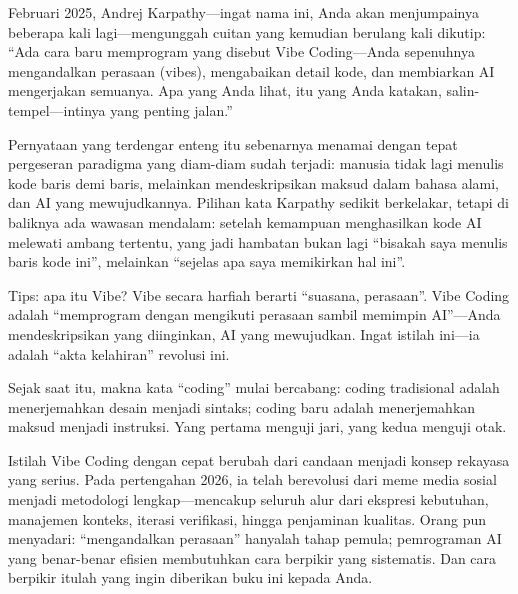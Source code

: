 


Februari 2025, Andrej Karpathy—ingat nama ini, Anda akan menjumpainya beberapa kali lagi—mengunggah cuitan yang kemudian berulang kali dikutip: “Ada cara baru memprogram yang disebut Vibe Coding—Anda sepenuhnya mengandalkan perasaan (vibes), mengabaikan detail kode, dan membiarkan AI mengerjakan semuanya. Apa yang Anda lihat, itu yang Anda katakan, salin-tempel—intinya yang penting jalan.”

Pernyataan yang terdengar enteng itu sebenarnya menamai dengan tepat pergeseran paradigma yang diam-diam sudah terjadi: manusia tidak lagi menulis kode baris demi baris, melainkan mendeskripsikan maksud dalam bahasa alami, dan AI yang mewujudkannya. Pilihan kata Karpathy sedikit berkelakar, tetapi di baliknya ada wawasan mendalam: setelah kemampuan menghasilkan kode AI melewati ambang tertentu, yang jadi hambatan bukan lagi “bisakah saya menulis baris kode ini”, melainkan “sejelas apa saya memikirkan hal ini”.

\begin{tcbinfo}{Tips: apa itu Vibe?}
Vibe secara harfiah berarti “suasana, perasaan”. Vibe Coding adalah “memprogram dengan mengikuti perasaan sambil memimpin AI”—Anda mendeskripsikan yang diinginkan, AI yang mewujudkan. Ingat istilah ini—ia adalah “akta kelahiran” revolusi ini.

\end{tcbinfo}

Sejak saat itu, makna kata “coding” mulai bercabang: coding tradisional adalah menerjemahkan desain menjadi sintaks; coding baru adalah menerjemahkan maksud menjadi instruksi. Yang pertama menguji jari, yang kedua menguji otak.

Istilah Vibe Coding dengan cepat berubah dari candaan menjadi konsep rekayasa yang serius. Pada pertengahan 2026, ia telah berevolusi dari meme media sosial menjadi metodologi lengkap—mencakup seluruh alur dari ekspresi kebutuhan, manajemen konteks, iterasi verifikasi, hingga penjaminan kualitas. Orang pun menyadari: “mengandalkan perasaan” hanyalah tahap pemula; pemrograman AI yang benar-benar efisien membutuhkan cara berpikir yang sistematis. Dan cara berpikir itulah yang ingin diberikan buku ini kepada Anda.

